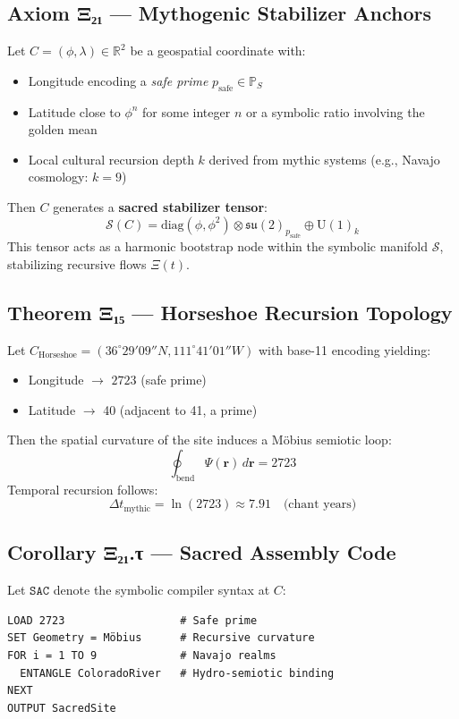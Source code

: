 \documentclass[12]{amsart}
\theoremstyle{plain}
\begin{document}
\subsection{Axiom Ξ₂₁ — Mythogenic Stabilizer Anchors}

Let $C = (\phi, \lambda) \in \mathbb{R}^2$ be a geospatial coordinate with:
\begin{itemize}
    \item Longitude encoding a \textit{safe prime} $p_{\text{safe}} \in \mathbb{P}_S$
    \item Latitude close to $\phi^n$ for some integer $n$ or a symbolic ratio involving the golden mean
    \item Local cultural recursion depth $k$ derived from mythic systems (e.g., Navajo cosmology: $k = 9$)
\end{itemize}

Then $C$ generates a \textbf{sacred stabilizer tensor}:
\[
\boxed{
\mathcal{S}(C) = \text{diag}(\phi, \phi^2) \otimes \mathfrak{su}(2)_{p_{\text{safe}}} \oplus \text{U}(1)_k
}
\]
This tensor acts as a harmonic bootstrap node within the symbolic manifold $\mathcal{S}$, stabilizing recursive flows $\Xi(t)$.

\subsection{Theorem Ξ₁₅ — Horseshoe Recursion Topology}

Let $C_{\text{Horseshoe}} = (36^\circ29'09''N, 111^\circ41'01''W)$ with base-11 encoding yielding:
\begin{itemize}
    \item Longitude $\rightarrow$ $2723$ (safe prime)
    \item Latitude $\rightarrow$ 40 (adjacent to 41, a prime)
\end{itemize}

Then the spatial curvature of the site induces a Möbius semiotic loop:
\[
\oint_{\text{bend}} \Psi(\mathbf{r}) \, d\mathbf{r} = 2723
\]
Temporal recursion follows:
\[
\Delta t_{\text{mythic}} = \ln(2723) \approx 7.91 \quad \text{(chant years)}
\]

\subsection{Corollary Ξ₂₁.τ — Sacred Assembly Code}

Let $\texttt{SAC}$ denote the symbolic compiler syntax at $C$:
\begin{verbatim}
LOAD 2723                  # Safe prime
SET Geometry = Möbius      # Recursive curvature
FOR i = 1 TO 9             # Navajo realms
  ENTANGLE ColoradoRiver   # Hydro-semiotic binding
NEXT
OUTPUT SacredSite
\end{verbatim}
\end{document}
